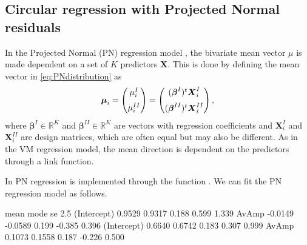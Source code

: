 \hypertarget{circular-regression-with-projected-normal-residuals}{%
\subsection{Circular regression with Projected Normal
residuals}\label{circular-regression-with-projected-normal-residuals}}

\label{projreg}

In the Projected Normal (PN) regression model \citep{nunez2011bayesian},
the bivariate mean vector \(\mu\) is made dependent on a set of \(K\)
predictors \(\boldsymbol{X}\). This is done by defining the mean vector
in \eqref{eq:PNdistribution} as \begin{equation}
\boldsymbol{\mu}_{i} = \begin{pmatrix}
  \mu_{i}^{I}  \vspace{0.2cm}  \\
\mu_{i}^{II}
 \end{pmatrix}=\begin{pmatrix}
  (\boldsymbol{\beta}^{I})^{t}\boldsymbol{X}_{i}^{I}  \vspace{0.2cm}  \\
  (\boldsymbol{\beta}^{II})^{t}\boldsymbol{X}_{i}^{II} 
 \end{pmatrix},
\end{equation} where \(\boldsymbol{\beta}^{I} \in \mathbb{R}^K\) and
\(\boldsymbol{\beta}^{II} \in \mathbb{R}^K\) are vectors with regression
coefficients and \(\boldsymbol{X}_{i}^{I}\) and
\(\boldsymbol{X}_{i}^{II}\) are design matrices, which are often equal
but may also be different. As in the VM regression model, the mean
direction is dependent on the predictors through a link function.

In  PN regression is implemented through the function
. We can fit the PN regression model as follows.

\begin{CodeChunk}


\begin{CodeOutput}
               mean    mode    se   2.5%
(Intercept)  0.9529  0.9317 0.188  0.599 1.339
AvAmp       -0.0149 -0.0589 0.199 -0.385 0.396
(Intercept)  0.6640  0.6742 0.183  0.307 0.999
AvAmp        0.1073  0.1558 0.187 -0.226 0.500
\end{CodeOutput}
\end{CodeChunk}

